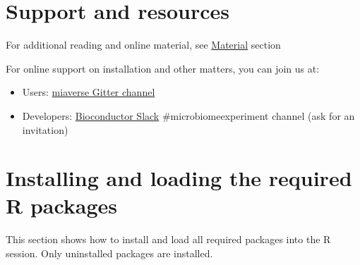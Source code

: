 \documentclass[
  oneside]{book}
\providecommand{\tightlist}{%
  \setlength{\itemsep}{0pt}\setlength{\parskip}{0pt}}
\begin{document}
\hypertarget{support-and-resources}{%
\section{Support and resources}\label{support-and-resources}}

For additional reading and online material, see \href{material.html}{Material} section

For online support on installation and other matters, you can join us at:

\begin{itemize}
\tightlist
\item
  Users: \href{https://gitter.im/microbiome/miaverse?utm_source=badge\&utm_medium=badge\&utm_campaign=pr-badge\&utm_content=badge}{miaverse Gitter channel}
\item
  Developers: \href{https://bioc-community.herokuapp.com}{Bioconductor Slack} \#microbiomeexperiment channel (ask for an invitation)
\end{itemize}

\hypertarget{installing-and-loading-the-required-r-packages}{%
\section{Installing and loading the required R packages}\label{installing-and-loading-the-required-r-packages}}

This section shows how to install and load all required packages into
the R session. Only uninstalled packages are installed.
\end{document}
